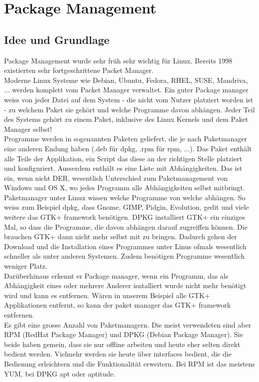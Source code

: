 \section{Package Management}
\subsection{Idee und Grundlage}
Package Management wurde sehr fr\"uh sehr wichtig f\"ur Linux. Bereits 1998 existierten sehr fortgeschrittene Packet Manager.\\
Moderne Linux Systeme wie Debian, Ubuntu, Fedora, RHEL, SUSE, Mandriva, ... werden komplett vom Packet Manager verwaltet. Ein guter Package manager weiss von jeder Datei auf dem System - die nicht vom Nutzer platziert worden ist - zu welchem Paket sie geh\"ort und welche Programme davon abh\"angen. Jeder Teil des Systems geh\"ort zu einem Paket, inklusive des Linux Kernels und dem Paket Manager selbst!\\
Programme werden in sogenannten Paketen geliefert, die je nach Paketmanager eine anderen Endung haben (.deb f\"ur dpkg, .rpm f\"ur rpm, ...). Das Paket enth\"alt alle Teile der Applikation, ein Script das diese an der richtigen Stelle platziert und konfiguriert. Ausserdem enth\"alt es eine Liste mit Abh\"angigkeiten. Das ist ein, wenn nicht DER, wesentlich Unterschied zum Paketmanagement von Windows und OS X, wo jedes Programm alle Abh\"angigkeiten selbst mitbringt.\\
Paketmanager unter Linux wissen welche Programme von welche abh\"angen. So weiss zum Beispiel dpkg, dass Gnome, GIMP, Pidgin, Evolution, gedit und viele weitere das GTK+ framework ben\"otigen. DPKG installiert GTK+ ein einziges Mal, so dass die Programme, die davon abh\"angen darauf zugreiffen k\"onnen. Die brauchen GTK+ dann nicht mehr selbst mit zu bringen. Dadurch gehen der Download und die Installation eines Programmes unter Linus ofmals wesentlich schneller als unter anderen Systemen. Zudem ben\"otigen Programme wesentlich weniger Platz.\\
Dar\"uberhinaus erkennt er Package manager, wenn ein Programm, das als Abh\"angigkeit eines oder mehrere Anderer isntalliert wurde nicht mehr ben\"otigt wird und kann es entfernen. W\"aren in unserem Beispiel alle GTK+ Applikationen entfernt, so kann der paket manager das GTK+ framework entfernen.\\
Es gibt eine grosse Anzahl von Paketmanagern. Die meist verwendeten sind aber RPM (RedHat Package Manager) und DPKG (Debian Package Manager). Sie beide haben gemein, dass sie nur offline arbeiten und heute eher selten direkt bedient werden. Vielmehr werden sie heute \"uber interfaces bedient, die die Bedienung erleichtern und die Funktionalit\"at erweitern. Bei RPM ist das meistens YUM, bei DPKG apt oder aptitude.\\
